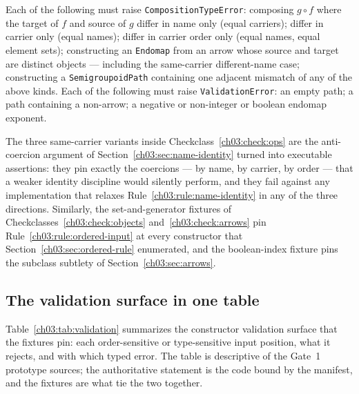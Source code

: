 \begin{checkclass}\label{ch03:check:ops}
Each of the following must raise \texttt{CompositionTypeError}:
composing $g \circ f$ where the target of $f$ and source of $g$ differ in
name only (equal carriers); differ in carrier only (equal names); differ
in carrier order only (equal names, equal element sets); constructing an
\texttt{Endomap} from an arrow whose source and target are distinct
objects --- including the same-carrier different-name case; constructing
a \texttt{SemigroupoidPath} containing one adjacent mismatch of any of
the above kinds. Each of the following must raise
\texttt{ValidationError}: an empty path; a path containing a non-arrow;
a negative or non-integer or boolean endomap exponent.
\end{checkclass}

The three same-carrier variants inside
Checkclass~\ref{ch03:check:ops} are the anti-coercion argument of
Section~\ref{ch03:sec:name-identity} turned into executable assertions:
they pin exactly the coercions --- by name, by carrier, by order --- that
a weaker identity discipline would silently perform, and they fail
against any implementation that relaxes
Rule~\ref{ch03:rule:name-identity} in any of the three directions.
Similarly, the set-and-generator fixtures of
Checkclasses~\ref{ch03:check:objects} and~\ref{ch03:check:arrows} pin
Rule~\ref{ch03:rule:ordered-input} at every constructor that
Section~\ref{ch03:sec:ordered-rule} enumerated, and the boolean-index
fixture pins the subclass subtlety of Section~\ref{ch03:sec:arrows}.

\subsection{The validation surface in one table}

Table~\ref{ch03:tab:validation} summarizes the constructor validation
surface that the fixtures pin: each order-sensitive or type-sensitive
input position, what it rejects, and with which typed error. The table
is descriptive of the Gate~1 prototype sources; the authoritative
statement is the code bound by the manifest, and the fixtures are what
tie the two together.

